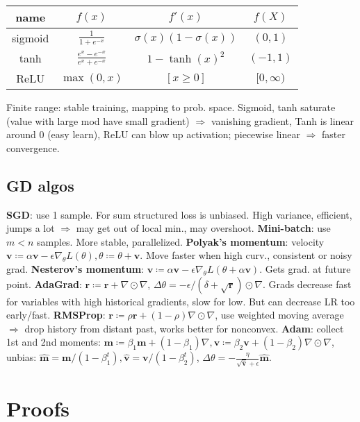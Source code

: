 \documentclass[11pt,landscape,a4paper,fleqn]{article}
\def\myvector#1{\mathbf{#1}}
\def\vm{{\myvector{m}}}
\def\vr{{\myvector{r}}}
\def\vv{{\myvector{v}}}
\begin{document}
\begin{multicols*}{4}
\begin{tabular}[]{@{}c@{}ccc@{}}
    \toprule
    name & $f(x)$ & $f'(x)$ & $f(X)$ \\
    \midrule
    sigmoid & $\frac{1}{1 + e^{-x}}$ & $\sigma(x)(1 - \sigma(x))$ & $(0, 1)$ \\
    tanh & $\frac{e^x - e^{-x}}{e^x + e^{-x}}$ & $1 - \tanh(x)^2$ & $( - 1, 1)$ \\
    ReLU & $\max(0, x)$ & $[x \geq 0]$ & $[0, \infty)$ \\
\end{tabular}
Finite range: stable training, mapping to prob. space.
Sigmoid, tanh saturate (value with large mod have small gradient) $ \Rightarrow $ vanishing gradient,
Tanh is linear around 0 (easy learn),
ReLU can blow up activation; piecewise linear $ \Rightarrow $ faster convergence.

\subsection{GD algos}

\textbf{SGD}: use 1 sample.
For sum structured loss is unbiased.
High variance, efficient, jumps a lot $ \Rightarrow $ may get out of local min.,
may overshoot.
\textbf{Mini-batch}: use $m < n$ samples.
More stable, parallelized.
\textbf{Polyak's momentum}: velocity $\vv \coloneqq \alpha \vv - \epsilon \nabla_\theta L(\theta), \theta \coloneqq \theta + \vv$.
Move faster when high curv., consistent or noisy grad.
\textbf{Nesterov's momentum}: $\vv \coloneqq \alpha \vv - \epsilon \nabla_\theta L(\theta + \alpha \vv)$.
Gets grad. at future point.
\textbf{AdaGrad}: $\vr \coloneqq \vr + \nabla \odot \nabla$, $\Delta \theta = - \epsilon / (\delta + \sqrt{\vr})
\odot \nabla$.
Grads decrease fast for variables with high historical gradients,
slow for low. But can decrease LR too early/fast.
\textbf{RMSProp}: $\vr \coloneqq \rho \vr + (1 - \rho) \nabla \odot \nabla$,
use weighted moving average $ \Rightarrow $ drop history from distant past,
works better for nonconvex.
\textbf{Adam}: collect 1st and 2nd moments:
$\vm \coloneqq \beta_1 \vm + (1 - \beta_1) \nabla, \vv \coloneqq \beta_2 \vv + (1 - \beta_2) \nabla \odot \nabla$,
unbias:
$\hat{\vm} = \vm / (1 - \beta_1^t), \hat{\vv} = \vv / (1 - \beta_2^t)$,
$\Delta \theta =- \frac{\eta}{\sqrt{\hat{\vv}} + \epsilon}\hat{\vm}$.



\section{Proofs}


\end{multicols*}
\end{document}
